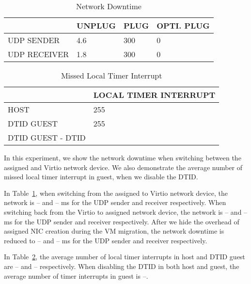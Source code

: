 

\begin{table}[]
\begin{tabular}{|l|l|l|l|}
\hline
& UNPLUG & PLUG & OPTI. PLUG \\ \hline
UDP SENDER & 4.6 & 300 & 0 \\ \hline
UDP RECEIVER & 1.8 & 300 & 0 \\ \hline
\end{tabular}
\caption{Network Downtime}
\label{tab:migration_network_downtime}
\end{table}

\begin{table}[]
\begin{tabular}{|l|l|}
\hline
& LOCAL TIMER INTERRUPT \\ \hline
HOST & 255 \\ \hline
DTID GUEST & 255 \\ \hline
DTID GUEST - DTID &  \\ \hline
\end{tabular}
\caption{Missed Local Timer Interrupt}
\label{tab:migration_missed_loc}
\end{table}

In this experiment, we show the network downtime when
switching between the assigned and Virtio network device. We
also demonstrate the average number of missed local timer
interrupt in guest, when we disable the DTID.

In Table~\ref{tab:migration_network_downtime}, when switching
from the assigned to Virtio network device, the network is --
and -- ms for the UDP sender and receiver respectively. When
switching back from the Virtio to assigned network device, the
network is -- and -- ms for the UDP sender and receiver
respectively. After we hide the overhead of assigned NIC
creation during the VM migration, the network downtime is
reduced to -- and -- ms for the UDP sender and receiver
respectively.

In Table~\ref{tab:migration_missed_loc}, the average number of
local timer interrupts in host and DTID guest are -- and --
respectively. When disabling the DTID in both host and guest,
the average number of timer interrupts in guest is --.
